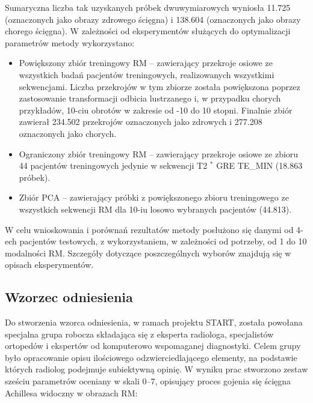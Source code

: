 Sumaryczna liczba tak uzyskanych próbek dwuwymiarowych wyniosła 11.725 (oznaczonych jako obrazy zdrowego ścięgna) i 138.604 (oznaczonych jako obrazy chorego ścięgna). W zależności od eksperymentów służących do optymalizacji parametrów metody wykorzystano:
\begin{itemize}
	\item Powiększony zbiór treningowy RM -- zawierający przekroje osiowe ze wszystkich badań pacjentów treningowych, realizowanych wszystkimi sekwencjami. Liczba przekrojów w tym zbiorze została powiększona poprzez zastosowanie transformacji odbicia lustrzanego i, w przypadku chorych przykładów, 10-ciu obrotów w zakresie od -10 do 10 stopni. Finalnie zbiór zawierał 234.502 przekrojów oznaczonych jako zdrowych i 277.208 oznaczonych jako chorych.
	\item Ograniczony zbiór treningowy RM -- zawierający przekroje osiowe ze zbioru 44 pacjentów treningowych jedynie w sekwencji T2 $^\ast$ GRE TE\_MIN (18.863 próbek).
	\item Zbiór PCA -- zawierający próbki z powiększonego zbioru treningowego ze wszystkich sekwencji RM dla 10-iu losowo wybranych pacjentów (44.813).
\end{itemize}

W celu wnioskowania i porównań rezultatów metody posłużono się danymi od 4-ech pacjentów testowych, z wykorzystaniem, w zależności od potrzeby, od 1 do 10 modalności RM. Szczegóły dotyczące poszczególnych wyborów znajdują się w opisach eksperymentów.


\subsection{Wzorzec odniesienia}
\label{seq:ground-truth}
Do stworzenia wzorca odniesienia, w ramach projektu START, została powołana specjalna grupa robocza składająca się z eksperta radiologa, specjalistów ortopedów i ekspertów od komputerowo wspomaganej diagnostyki. Celem grupy było opracowanie opisu ilościowego odzwierciedlającego elementy, na podstawie których radiolog podejmuje subiektywną opinię. W wyniku prac stworzono zestaw sześciu parametrów oceniany w skali 0--7, opisujący proces gojenia się ścięgna Achillesa widoczny w obrazach RM:

